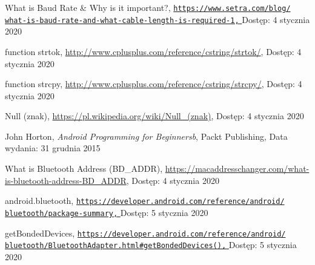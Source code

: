\documentclass[a4paper,12pt, twoside]{article}
\begin{document}
\begin{thebibliography}{}
    		What is Baud Rate \& Why is it important?,
    		\newline\href{https://www.setra.com/blog/what-is-baud-rate-and-what-cable-length-is-required-1}
    		 {\nolinkurl{https://www.setra.com/blog/}
                 \\
                  \nolinkurl{what-is-baud-rate-and-what-cable-length-is-required-1,}
                 }
    		\newline Dostęp: 4 stycznia 2020
    		
    		function strtok,
    		\newline\url{http://www.cplusplus.com/reference/cstring/strtok/}, 
    		\newline Dostęp: 4 stycznia 2020
    		
    		function strcpy,
    		\newline\url{http://www.cplusplus.com/reference/cstring/strcpy/}, 
    		\newline Dostęp: 4 stycznia 2020
    		
    		Null (znak),
    		\newline\url{https://pl.wikipedia.org/wiki/Null_(znak)}, 
    		\newline Dostęp: 4 stycznia 2020
    		
    	    John Horton, \textit{Android Programming for Beginnersb}, Packt Publishing,
    		\newline Data wydania: 31 grudnia 2015
    		
    		What is Bluetooth Address (BD\_ADDR),
    		\newline\url{https://macaddresschanger.com/what-is-bluetooth-address-BD_ADDR}, 
    		\newline Dostęp: 4 stycznia 2020
    		
    		android.bluetooth,
    		\newline\href{https://developer.android.com/reference/android/bluetooth/}
    		 {\nolinkurl{https://developer.android.com/reference/android/}
                 \\
                  \nolinkurl{bluetooth/package-summary,}
                 }
    		\newline Dostęp: 5 stycznia 2020
    		
    		getBondedDevices,
    		\newline\href{https://developer.android.com/reference/android/bluetooth/BluetoothAdapter.html\#getBondedDevices()}
    		 {\nolinkurl{https://developer.android.com/reference/android/}
                 \\
                  \nolinkurl{bluetooth/BluetoothAdapter.html\#getBondedDevices(),}
                 }
    		\newline Dostęp: 5 stycznia 2020
    		

\end{thebibliography}
\end{document}
